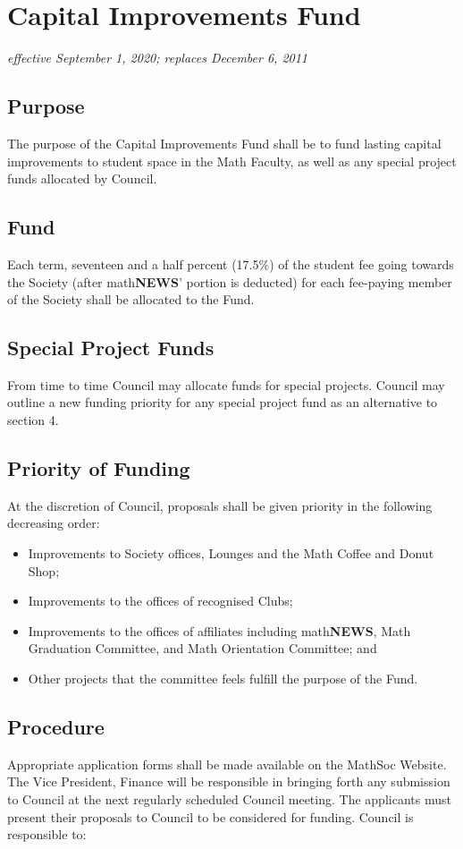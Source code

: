 \section{Capital Improvements Fund}
\emph{effective September 1, 2020; replaces December 6, 2011}

\subsection{Purpose}
The purpose of the Capital Improvements Fund shall be to fund lasting capital improvements to student space in the Math Faculty, as well as any special project funds allocated by Council.

\subsection{Fund}
Each term, seventeen and a half percent (17.5\%) of the student fee going towards the 
Society (after math\textbf{\textsf{NEWS}}' portion is deducted) for each fee-paying member of the 
Society shall be allocated to the Fund.

\subsection{Special Project Funds}
From time to time Council may allocate funds for special projects. Council may outline a new funding priority for any special project fund as an alternative to section 4.

\subsection{Priority of Funding}
At the discretion of Council, proposals shall be given priority in the following decreasing order:\
\begin{itemize}
\item Improvements to Society offices, Lounges and the Math Coffee and Donut Shop;
\item Improvements to the offices of recognised Clubs;
\item Improvements to the offices of affiliates including math\textbf{\textsf{NEWS}}, Math Graduation Committee, and Math Orientation Committee; and
\item Other projects that the committee feels fulfill the purpose of the Fund.
\end{itemize}

\subsection{Procedure}
Appropriate application forms shall be made available on the MathSoc Website. The Vice
President, Finance will be responsible in bringing forth any submission to Council 
at the next regularly scheduled Council meeting. The applicants must present their 
proposals to Council to be considered for funding. Council is responsible to:

